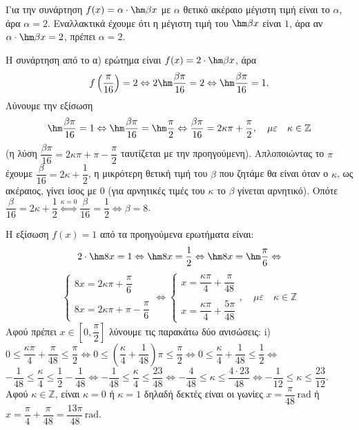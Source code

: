 \begin{alist}
\item Για την συνάρτηση $f(x) = \alpha \cdot \hm \beta x$ με $\alpha$ θετικό ακέραιο μέγιστη τιμή είναι το $\alpha$, άρα $\alpha = 2$.
Εναλλακτικά έχουμε ότι η μέγιστη τιμή του $\hm \beta x$ είναι $1$, άρα αν $\alpha \cdot \hm \beta x = 2$, πρέπει $\alpha = 2$.
\item Η συνάρτηση από το α) ερώτημα είναι $f(x) = 2 \cdot \hm \beta x$, άρα
\[f\left(\dfrac{\pi}{16}\right) = 2 \Leftrightarrow 2\hm \dfrac{\beta\pi}{16} = 2 \Leftrightarrow \hm \dfrac{\beta\pi}{16} = 1.\]
Λύνουμε την εξίσωση
\[\hm \dfrac{\beta\pi}{16} = 1 \Leftrightarrow \hm \dfrac{\beta\pi}{16} = \hm \dfrac{\pi}{2} \Leftrightarrow \dfrac{\beta\pi}{16} = 2\kappa\pi + \dfrac{\pi}{2}, \quad \mu\varepsilon \quad \kappa \in \mathbb{Z}\]
(η λύση $\dfrac{\beta\pi}{16} = 2\kappa\pi + \pi - \dfrac{\pi}{2}$ ταυτίζεται με την προηγούμενη).
Απλοποιώντας το $\pi$ έχουμε $\dfrac{\beta}{16} = 2\kappa + \dfrac{1}{2}$, η μικρότερη θετική τιμή του $\beta$ που ζητάμε θα είναι όταν ο $\kappa$, ως ακέραιος, γίνει ίσος με $0$ (για αρνητικές τιμές του $\kappa$ το $\beta$ γίνεται αρνητικό). Οπότε $\dfrac{\beta}{16} = 2\kappa + \dfrac{1}{2} \overset{\kappa=0}{\iff} \dfrac{\beta}{16} = \dfrac{1}{2} \Leftrightarrow \beta = 8$.
\item Η εξίσωση $f(x) = 1$ από τα προηγούμενα ερωτήματα είναι:
\[2 \cdot \hm  8x = 1 \Leftrightarrow \hm  8x = \dfrac{1}{2} \Leftrightarrow \hm  8x = \hm \dfrac{\pi}{6} \Leftrightarrow\]
\[\begin{cases} 8x = 2\kappa\pi + \dfrac{\pi}{6} \\ \\ 8x = 2\kappa\pi + \pi - \dfrac{\pi}{6} \end{cases} \Leftrightarrow \begin{cases} x = \dfrac{\kappa\pi}{4} + \dfrac{\pi}{48} \\ \\ x = \dfrac{\kappa\pi}{4} + \dfrac{5\pi}{48} \end{cases}, \quad \mu\varepsilon \quad \kappa \in \mathbb{Z}\]
Αφού πρέπει $x \in \left[0, \dfrac{\pi}{2}\right]$ λύνουμε τις παρακάτω δύο ανισώσεις:
i) $0 \le \dfrac{\kappa\pi}{4} + \dfrac{\pi}{48} \le \dfrac{\pi}{2} \Leftrightarrow 0 \le \left(\dfrac{\kappa}{4} + \dfrac{1}{48}\right)\pi \le \dfrac{\pi}{2} \Leftrightarrow 0 \le \dfrac{\kappa}{4} + \dfrac{1}{48} \le \dfrac{1}{2} \Leftrightarrow$
$-\dfrac{1}{48} \le \dfrac{\kappa}{4} \le \dfrac{1}{2} - \dfrac{1}{48} \Leftrightarrow -\dfrac{1}{48} \le \dfrac{\kappa}{4} \le \dfrac{23}{48} \Leftrightarrow -\dfrac{4}{48} \le \kappa \le \dfrac{4 \cdot 23}{48} \Leftrightarrow -\dfrac{1}{12} \le \kappa \le \dfrac{23}{12}.$
Αφού $\kappa \in \mathbb{Z}$, είναι $\kappa = 0$ ή $\kappa = 1$ δηλαδή δεκτές είναι οι γωνίες $x = \dfrac{\pi}{48}\,\text{rad}$ ή $x = \dfrac{\pi}{4} + \dfrac{\pi}{48} = \dfrac{13\pi}{48}\,\text{rad}$.
\end{alist}

